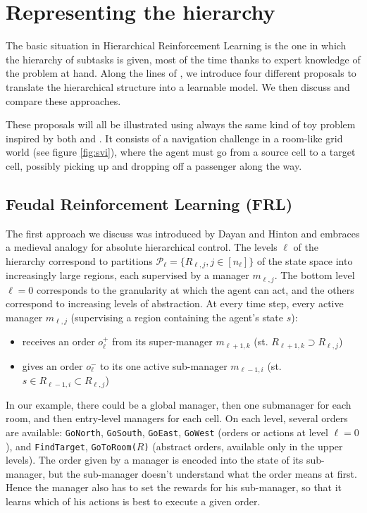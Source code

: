 \documentclass{article}
\begin{document}
\section{Representing the hierarchy} \label{representing}

The basic situation in Hierarchical Reinforcement Learning is the one in which the hierarchy of subtasks is given, most of the time thanks to expert knowledge of the problem at hand. Along the lines of \cite{barto_recent_2003}, we introduce four different proposals to translate the hierarchical structure into a learnable model. We then discuss and compare these approaches.

These proposals will all be illustrated using always the same kind of toy problem inspired by both \cite{dietterich_hierarchical_2000} and \cite{sutton_between_1999}. It consists of a navigation challenge in a room-like grid world (see figure \ref{fig:svi}), where the agent must go from a source cell to a target cell, possibly picking up and dropping off a passenger along the way.

\subsection{Feudal Reinforcement Learning (FRL)}

The first approach we discuss was introduced by Dayan and Hinton \cite{dayan_feudal_1993} and embraces a medieval analogy for absolute hierarchical control. The levels $\ell$ of the hierarchy correspond to partitions $\mathcal{P}_{\ell} = \{R_{\ell, j}, j \in [n_{\ell}]\}$ of the state space into increasingly large regions, each supervised by a manager $m_{\ell, j}$. The bottom level $\ell = 0$ corresponds to the granularity at which the agent can act, and the others correspond to increasing levels of abstraction. At every time step, every active manager $m_{\ell, j}$ (supervising a region containing the agent's state $s$):
\begin{itemize}
    \item receives an order $o_{\ell}^+$ from its super-manager $m_{\ell+1, k}$ (st. $R_{\ell+1, k}  \supset R_{\ell, j}$)
    \item gives an order $o_{\ell}^-$ to its one active sub-manager $m_{\ell-1, i}$ (st. $s \in R_{\ell-1, i} \subset R_{\ell, j}$)
\end{itemize}

In our example, there could be a global manager, then one submanager for each room, and then entry-level managers for each cell. On each level, several orders are available: \texttt{GoNorth}, \texttt{GoSouth}, \texttt{GoEast}, \texttt{GoWest} (orders or actions at level $\ell=0$), and \texttt{FindTarget}, \texttt{GoToRoom($R$)} (abstract orders, available only in the upper levels). The order given by a manager is encoded into the state of its sub-manager, but the sub-manager doesn't understand what the order means at first. Hence the manager also has to set the rewards for his sub-manager, so that it learns which of his actions is best to execute a given order.
\end{document}
